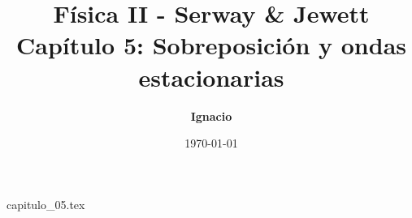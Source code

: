 \documentclass[11pt,spanish,oneside]{report}
\title{\textbf{Física II - Serway \& Jewett} \\ \Large Capítulo 5: Sobreposición y ondas estacionarias}
\author{\textbf{Ignacio}}
\date{\today}
\begin{document}
\maketitle

{capitulo_05.tex}
\end{document}
